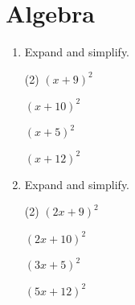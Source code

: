 \chapter{Algebra}

\begin{enumerate} [leftmargin=0cm] 
\item Expand and simplify.
\begin{tasks}[label=(\arabic*), after-item-skip=2pt,after-skip=3pt, label-width=4ex](2)
    \task  $ (x+ 9)^2   $    \\  \begin{envAnswer} { }\end{envAnswer}
    \task  $ (x+10)^2   $    \\  \begin{envAnswer} { }\end{envAnswer}
    \task  $ (x+ 5)^2   $    \\  \begin{envAnswer} { }\end{envAnswer}
    \task  $ (x+12)^2   $    \\  \begin{envAnswer} { }\end{envAnswer}
\end{tasks}

\item Expand and simplify.
\begin{tasks}[label=(\arabic*), after-item-skip=2pt,after-skip=3pt, label-width=4ex](2)
    \task  $ (2x+ 9)^2  $    \\  \begin{envAnswer} { }\end{envAnswer}
    \task  $ (2x+10)^2  $    \\  \begin{envAnswer} { }\end{envAnswer}
    \task  $ (3x+ 5)^2  $    \\  \begin{envAnswer} { }\end{envAnswer}
    \task  $ (5x+12)^2  $    \\  \begin{envAnswer} { }\end{envAnswer}
\end{tasks}



\end{enumerate}
